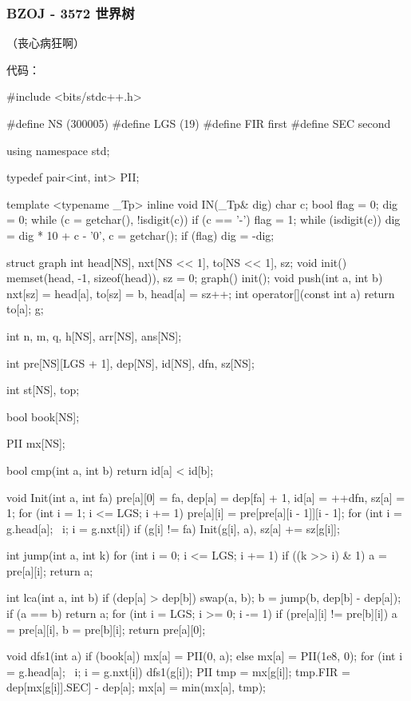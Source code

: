 {\subsubsection{BZOJ - 3572 世界树}

（丧心病狂啊）

代码：

\begin{cppcode}
#include <bits/stdc++.h>

#define NS (300005)
#define LGS (19)
#define FIR first
#define SEC second

using namespace std;

typedef pair<int, int> PII;

template <typename _Tp>
inline void IN(_Tp& dig) {
  char c;
  bool flag = 0;
  dig = 0;
  while (c = getchar(), !isdigit(c))
    if (c == '-') flag = 1;
  while (isdigit(c)) dig = dig * 10 + c - '0', c = getchar();
  if (flag) dig = -dig;
}

struct graph {
  int head[NS], nxt[NS << 1], to[NS << 1], sz;
  void init() { memset(head, -1, sizeof(head)), sz = 0; }
  graph() { init(); }
  void push(int a, int b) { nxt[sz] = head[a], to[sz] = b, head[a] = sz++; }
  int operator[](const int a) { return to[a]; }
} g;

int n, m, q, h[NS], arr[NS], ans[NS];

int pre[NS][LGS + 1], dep[NS], id[NS], dfn, sz[NS];

int st[NS], top;

bool book[NS];

PII mx[NS];

bool cmp(int a, int b) { return id[a] < id[b]; }

void Init(int a, int fa) {
  pre[a][0] = fa, dep[a] = dep[fa] + 1, id[a] = ++dfn, sz[a] = 1;
  for (int i = 1; i <= LGS; i += 1) pre[a][i] = pre[pre[a][i - 1]][i - 1];
  for (int i = g.head[a]; ~i; i = g.nxt[i])
    if (g[i] != fa) Init(g[i], a), sz[a] += sz[g[i]];
}

int jump(int a, int k) {
  for (int i = 0; i <= LGS; i += 1)
    if ((k >> i) & 1) a = pre[a][i];
  return a;
}

int lca(int a, int b) {
  if (dep[a] > dep[b]) swap(a, b);
  b = jump(b, dep[b] - dep[a]);
  if (a == b) return a;
  for (int i = LGS; i >= 0; i -= 1)
    if (pre[a][i] != pre[b][i]) a = pre[a][i], b = pre[b][i];
  return pre[a][0];
}

void dfs1(int a) {
  if (book[a])
    mx[a] = PII(0, a);
  else
    mx[a] = PII(1e8, 0);
  for (int i = g.head[a]; ~i; i = g.nxt[i]) {
    dfs1(g[i]);
    PII tmp = mx[g[i]];
    tmp.FIR = dep[mx[g[i]].SEC] - dep[a];
    mx[a] = min(mx[a], tmp);
  }
}


\end{cppcode}}
